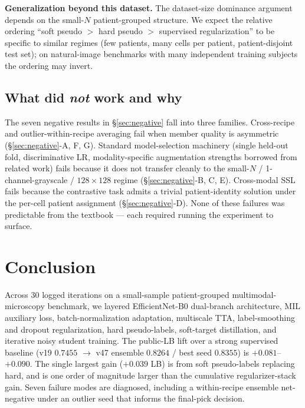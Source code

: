 \documentclass[conference]{IEEEtran}
\begin{document}
\textbf{Generalization beyond this dataset.} The dataset-size dominance argument depends on the small-$N$ patient-grouped structure. We expect the relative ordering ``soft pseudo $>$ hard pseudo $>$ supervised regularization'' to be specific to similar regimes (few patients, many cells per patient, patient-disjoint test set); on natural-image benchmarks with many independent training subjects the ordering may invert.

\subsection{What did \emph{not} work and why}

The seven negative results in \S\ref{sec:negative} fall into three families. Cross-recipe and outlier-within-recipe averaging fail when member quality is asymmetric (\S\ref{sec:negative}-A, F, G). Standard model-selection machinery (single held-out fold, discriminative LR, modality-specific augmentation strengths borrowed from related work) fails because it does not transfer cleanly to the small-$N$ / 1-channel-grayscale / $128 \times 128$ regime (\S\ref{sec:negative}-B, C, E). Cross-modal SSL fails because the contrastive task admits a trivial patient-identity solution under the per-cell patient assignment (\S\ref{sec:negative}-D). None of these failures was predictable from the textbook --- each required running the experiment to surface.

\section{Conclusion}
\label{sec:conclusion}

Across 30 logged iterations on a small-sample patient-grouped multimodal-microscopy benchmark, we layered EfficientNet-B0 dual-branch architecture, MIL auxiliary loss, batch-normalization adaptation, multiscale TTA, label-smoothing and dropout regularization, hard pseudo-labels, soft-target distillation, and iterative noisy student training. The public-LB lift over a strong supervised baseline (v19 $0.7455$ $\rightarrow$ v47 ensemble $0.8264$ / best seed $0.8355$) is $+0.081$--$+0.090$. The single largest gain ($+0.039$ LB) is from soft pseudo-labels replacing hard, and is one order of magnitude larger than the cumulative regularizer-stack gain. Seven failure modes are diagnosed, including a within-recipe ensemble net-negative under an outlier seed that informs the final-pick decision.
\end{document}
